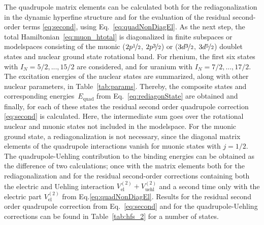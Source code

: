 The quadrupole matrix elements can be calculated both for the rediagonalization in the dynamic hyperfine structure and for the evaluation of the residual second-order terms \eqref{eq:second}, using Eq.~\eqref{eq:quadNonDiagEl}. As the next step, the total Hamiltonian~\eqref{eq:muon_htotal} is diagonalized in finite subspaces or modelspaces consisting of the muonic ($2p\nicefrac{1}{2}$, $2p\nicefrac{3}{2}$) or ($3d\nicefrac{3}{2}$, $3d\nicefrac{5}{2}$) doublet states and nuclear ground state rotational band. For rhenium, the first six states with $I_N =5/2,...,15/2$ are considered, and for uranium with $I_N =7/2,...,17/2$. The excitation energies of the nuclear states are summarized, along with other nuclear parameters, in Table~\ref{tab:params}. Thereby, the composite states and corresponding energies~$E_{\text{quad}}$ from Eq.~\eqref{eq:rediagonState} are obtained and finally, for each of these states the residual second order quadrupole correction \eqref{eq:second} is calculated. Here, the intermediate sum goes over the rotational nuclear and muonic states not included in the modelspace.
For the muonic ground state, a rediagonalization is not necessary, since the diagonal matrix elements of the quadrupole interactions vanish for muonic states with $j=1/2$.
The quadrupole-Uehling contribution to the binding energies can be obtained as the difference of two calculations; once with the matrix elements both for the rediagonalization and for the residual second-order corrections containing both the electric and Uehling interaction ${V_{\text{el}}^{(2)}}{+}{V_{\text{uehl}}^{(2)}}$ and a second time only with the electric part ${V_{\text{el}}^{(2)}}$ from Eq.\eqref{eq:quadNonDiagEl}. Results for the residual second order quadrupole correction from Eq.~\eqref{eq:second} and for the quadrupole-Uehling corrections can be found in Table~\ref{tab:hfs_2} for a number of states.\\

